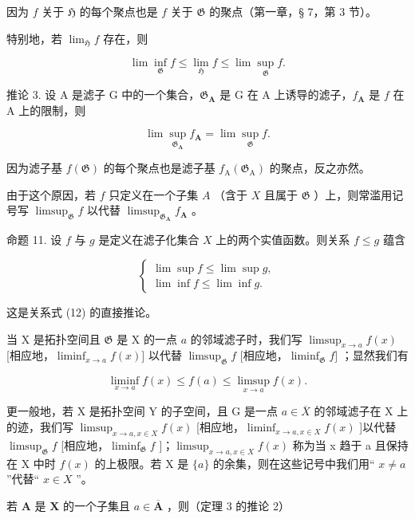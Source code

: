 因为 \(f\) 关于 \(\mathfrak{H}\) 的每个聚点也是 \(f\) 关于 \(\mathfrak{G}\) 的聚点（第一章，§ 7，第 3 节）。

特别地，若 \(\lim_{\mathfrak{H}}f\) 存在，则

\[
\lim \inf _ {\mathfrak {G}} f \leqslant \lim _ {\mathfrak {H}} f \leqslant \lim \sup _ {\mathfrak {G}} f.
\]

推论 3. 设 A 是滤子 G 中的一个集合，\(\mathfrak{G}_{\mathbf{A}}\) 是 G 在 A 上诱导的滤子，\(f_{\mathbf{A}}\) 是 \(f\) 在 A 上的限制，则

\[
\lim \sup _ {\mathfrak {G} _ {\mathbf {A}}} f _ {\mathbf {A}} = \lim \sup _ {\mathfrak {G}} f.
\]

因为滤子基 \(f(\mathfrak{G})\) 的每个聚点也是滤子基 \(f_{\mathrm{A}}(\mathfrak{G}_{\mathrm{A}})\) 的聚点，反之亦然。

由于这个原因，若 \(f\) 只定义在一个子集 \(A\) （含于 \(X\) 且属于 \(\mathfrak{G}\) ）上，则常滥用记号写 \(\limsup_{\mathfrak{G}} f\) 以代替 \(\limsup_{\mathfrak{G}_{\mathbf{A}}} f_{\mathbf{A}}\) 。

命题 11. 设 \(f\) 与 \(g\) 是定义在滤子化集合 \(X\) 上的两个实值函数。则关系 \(f \leqslant g\) 蕴含

\[
\left\{ \begin{array}{l} \lim \sup f \leqslant \lim \sup g, \\ \lim \inf f \leqslant \lim \inf g. \end{array} \right.\tag{14}
\]

这是关系式 (12) 的直接推论。

当 X 是拓扑空间且 \(\mathfrak{G}\) 是 X 的一点 \(a\) 的邻域滤子时，我们写 \(\limsup_{x\to a}f(x)\) {[}相应地，\(\liminf_{x\to a}f(x)]\) 以代替 \(\limsup_{\mathfrak{G}}f\) {[}相应地，\(\liminf_{\mathfrak{G}}f]\) ；显然我们有

\[
\liminf _ {x \to a} f (x) \leqslant f (a) \leqslant \limsup _ {x \to a} f (x).\tag{15}
\]

更一般地，若 X 是拓扑空间 Y 的子空间，且 G 是一点 \(a \in \overline{X}\) 的邻域滤子在 X 上的迹，我们写 \(\limsup_{x \to a, x \in X} f(x)\) {[}相应地，\(\liminf_{x \to a, x \in X} f(x)\) {]}以代替 \(\limsup_{\mathfrak{G}} f\) {[}相应地，\(\liminf_{\mathfrak{G}} f\) {]}；\(\limsup_{x \to a, x \in X} f(x)\) 称为当 x 趋于 a 且保持在 X 中时 \(f(x)\) 的上极限。若 X 是 \(\{a\}\) 的余集，则在这些记号中我们用`` \(x \neq a\) ''代替`` \(x \in X\) ''。

若 \(\mathbf{A}\) 是 \(\mathbf{X}\) 的一个子集且 \(a \in \overline{\mathbf{A}}\) ，则（定理 3 的推论 2）

